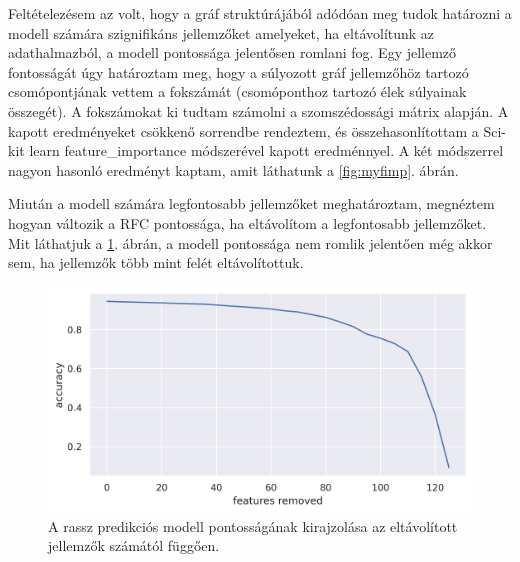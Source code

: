 Feltételezésem az volt, hogy a gráf struktúrájából adódóan meg tudok határozni a modell számára szignifikáns jellemzőket amelyeket, ha eltávolítunk az adathalmazból, a modell pontossága jelentősen romlani fog. Egy jellemző fontosságát úgy határoztam meg, hogy a súlyozott gráf jellemzőhöz tartozó csomópontjának vettem a fokszámát (csomóponthoz tartozó élek súlyainak összegét). A fokszámokat ki tudtam számolni a szomszédossági mátrix alapján. A kapott eredményeket csökkenő sorrendbe rendeztem, és összehasonlítottam a Sci-kit learn feature\_importance módszerével kapott eredménnyel. A két módszerrel nagyon hasonló eredményt kaptam, amit láthatunk a \ref{fig:myfimp}. ábrán. 

Miután a modell számára legfontosabb jellemzőket meghatároztam, megnéztem hogyan változik a RFC pontossága, ha eltávolítom a legfontosabb jellemzőket. Mit láthatjuk a \ref{fig:retrain_agane}. ábrán, a modell pontossága nem romlik jelentően még akkor sem, ha jellemzők több mint felét eltávolítottuk.

\begin{figure}[ht]
	\centering
	\includegraphics[width=0.8\columnwidth]{figures/network_race_graph.png}
	\caption{A rassz predikciós modell pontosságának kirajzolása az eltávolított jellemzők számától függően.}
	\label{fig:retrain_agane}
\end{figure}
